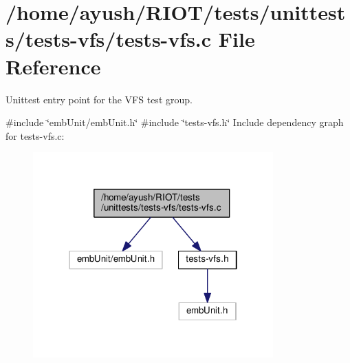 \hypertarget{tests-vfs_8c}{}\section{/home/ayush/\+R\+I\+O\+T/tests/unittests/tests-\/vfs/tests-\/vfs.c File Reference}
\label{tests-vfs_8c}


Unittest entry point for the V\+FS test group.  


{\ttfamily \#include \char`\"{}emb\+Unit/emb\+Unit.\+h\char`\"{}}\newline
{\ttfamily \#include \char`\"{}tests-\/vfs.\+h\char`\"{}}\newline
Include dependency graph for tests-\/vfs.c\+:
\nopagebreak
\begin{figure}[H]
\begin{center}
\leavevmode
\includegraphics[width=262pt]{tests-vfs_8c__incl}
\end{center}
\end{figure}
